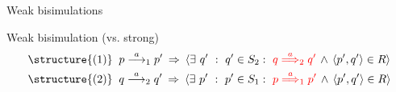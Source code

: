 \documentclass[aspectratio=169]{beamer}
\begin{document}
\begin{slide}{Weak bisimulations}
\begin{block}{Weak bisimulation (vs. strong)}
\vspace{-8mm}
\begin{align*}
\text{\structure{(1)}}\; \;  & p \rtran{a}_1 p'\; \imp\;
  \rcb{\exists}{q'}{q' \in S_2}{\rdb{q \Trans{a}_2  q'}\, \e\,
  \pair{p',q'} \in R}   \\
\text{\structure{(2)}}\; \;  & q \rtran{a}_2 q'\; \imp\;
  \rcb{\exists}{p'}{p' \in S_1}{\rdb{p \Trans{a}_1 p'}\, \e\,
  \pair{p',q'} \in R}   
\end{align*}
\end{block}
\end{slide}
\end{document}
